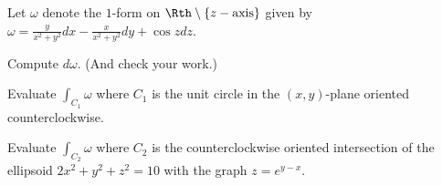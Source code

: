 Let $\omega$ denote the $1$-form on $\Rth\setminus\{z-\text{axis}\}$
given by $\omega=\frac{y}{x^2+y^2}dx-\frac{x}{x^2+y^2}dy+\cos z dz$.
\begin{alist}
\item Compute $d\omega$. (And check your work.)
\item Evaluate $\int_{C_1}\omega$ where $C_1$ is the unit circle in
the $(x,y)$-plane oriented counterclockwise.
\item Evaluate $\int_{C_2}\omega$ where $C_2$ is the counterclockwise
oriented intersection of the ellipsoid $2x^2+y^2+z^2=10$ with the
graph $z=e^{y-x}$.
\end{alist}
